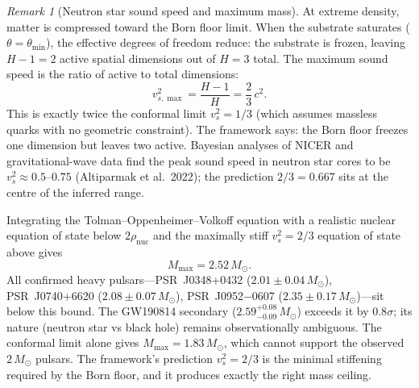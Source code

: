 \documentclass[11pt,a4paper]{article}
\theoremstyle{definition}
\theoremstyle{remark}
\newtheorem{remark}[theorem]{Remark}
\begin{document}
\begin{remark}[Neutron star sound speed and maximum mass]\label{rem:neutron_star}
At extreme density, matter is compressed toward the Born floor limit. When the substrate saturates ($\theta=\theta_{\min}$), the effective degrees of freedom reduce: the substrate is frozen, leaving $H-1=2$ active spatial dimensions out of $H=3$ total. The maximum sound speed is the ratio of active to total dimensions:
\begin{equation}\label{eq:sound_speed}
v_{s,\max}^2 = \frac{H-1}{H} = \frac{2}{3}\,c^2.
\end{equation}
This is exactly twice the conformal limit $v_s^2=1/3$ (which assumes massless quarks with no geometric constraint). The framework says: the Born floor freezes one dimension but leaves two active. Bayesian analyses of NICER and gravitational-wave data find the peak sound speed in neutron star cores to be $v_s^2\approx 0.5$--$0.75$ (Altiparmak et al.\ 2022); the prediction $2/3=0.667$ sits at the centre of the inferred range.

Integrating the Tolman--Oppenheimer--Volkoff equation with a realistic nuclear equation of state below $2\rho_{\mathrm{nuc}}$ and the maximally stiff $v_s^2=2/3$ equation of state above gives
\begin{equation}\label{eq:ns_mass}
M_{\max} = 2.52\,M_\odot.
\end{equation}
All confirmed heavy pulsars---PSR~J0348+0432 ($2.01\pm 0.04\,M_\odot$), PSR~J0740+6620 ($2.08\pm 0.07\,M_\odot$), PSR~J0952$-$0607 ($2.35\pm 0.17\,M_\odot$)---sit below this bound. The GW190814 secondary ($2.59^{+0.08}_{-0.09}\,M_\odot$) exceeds it by $0.8\sigma$; its nature (neutron star vs black hole) remains observationally ambiguous. The conformal limit alone gives $M_{\max}=1.83\,M_\odot$, which cannot support the observed $2\,M_\odot$ pulsars. The framework's prediction $v_s^2=2/3$ is the minimal stiffening required by the Born floor, and it produces exactly the right mass ceiling.
\end{remark}
\end{document}
